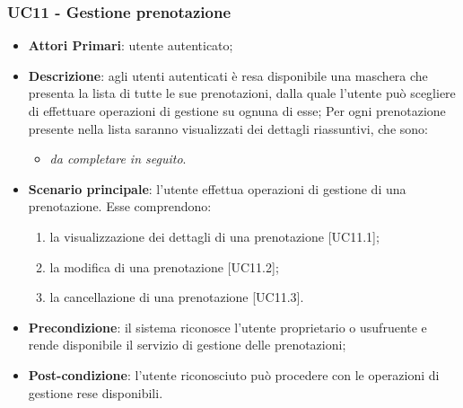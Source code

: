 \subsubsection{UC11 - Gestione prenotazione}
\begin{itemize}
	\item \textbf{Attori Primari}: utente autenticato;
	\item \textbf{Descrizione}: agli utenti autenticati è resa disponibile una maschera che presenta la lista di tutte le sue prenotazioni, dalla quale l'utente può scegliere di effettuare operazioni di gestione su ognuna di esse;
	Per ogni prenotazione presente nella lista saranno visualizzati dei dettagli riassuntivi, che sono:
	\begin{itemize}
		\item \textit{da completare in seguito}.
	\end{itemize}
	\item \textbf{Scenario principale}: l'utente effettua operazioni di gestione di una prenotazione. Esse comprendono:
	\begin{enumerate}[label=\alph*.]
		\item la visualizzazione dei dettagli di una prenotazione [UC11.1];
		\item la modifica di una prenotazione [UC11.2];
		\item la cancellazione di una prenotazione [UC11.3].
	\end{enumerate}
	\item \textbf{Precondizione}: il sistema riconosce l'utente proprietario o usufruente e rende disponibile il servizio di gestione delle prenotazioni;
	\item \textbf{Post-condizione}: l'utente riconosciuto può procedere con le operazioni di gestione rese disponibili.
\end{itemize} 
